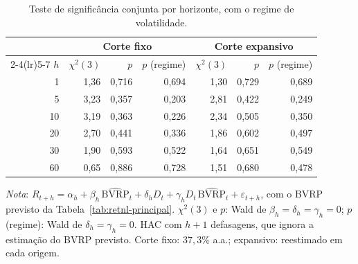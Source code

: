 \begin{table}[H]
\centering
\small
\caption{Teste de significância conjunta por horizonte, com o regime de volatilidade.}
\label{tab:retnl-regime}
\begin{tabular}{rrrrrrr}
\toprule
 & \multicolumn{3}{c}{Corte fixo} & \multicolumn{3}{c}{Corte expansivo} \\ \cmidrule(lr){2-4}\cmidrule(lr){5-7}
$h$ & $\chi^2(3)$ & $p$ & $p$ (regime) & $\chi^2(3)$ & $p$ & $p$ (regime) \\
\midrule
1 & 1{,}36 & 0{,}716 & 0{,}694 & 1{,}30 & 0{,}729 & 0{,}689 \\
5 & 3{,}23 & 0{,}357 & 0{,}203 & 2{,}81 & 0{,}422 & 0{,}249 \\
10 & 3{,}19 & 0{,}363 & 0{,}226 & 2{,}34 & 0{,}505 & 0{,}350 \\
20 & 2{,}70 & 0{,}441 & 0{,}336 & 1{,}86 & 0{,}602 & 0{,}497 \\
30 & 1{,}90 & 0{,}593 & 0{,}522 & 1{,}64 & 0{,}651 & 0{,}549 \\
60 & 0{,}65 & 0{,}886 & 0{,}728 & 1{,}51 & 0{,}680 & 0{,}478 \\
\bottomrule
\end{tabular}
\par\smallskip
\parbox{0.95\linewidth}{\footnotesize\textit{Nota}: $R_{t+h} = \alpha_h + \beta_h\,\widehat{\text{BVRP}}_t + \delta_h D_t + \gamma_h D_t\,\widehat{\text{BVRP}}_t + \varepsilon_{t+h}$, com o BVRP previsto da Tabela~\ref{tab:retnl-principal}. $\chi^2(3)$ e $p$: Wald de $\beta_h = \delta_h = \gamma_h = 0$; $p$ (regime): Wald de $\delta_h = \gamma_h = 0$. HAC com $h+1$ defasagens, que ignora a estimação do BVRP previsto. Corte fixo: $37{,}3\%$ a.a.; expansivo: reestimado em cada origem.}
\end{table}
